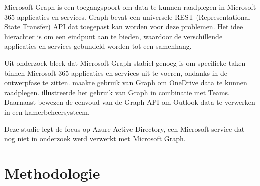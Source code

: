 Microsoft Graph is een toegangspoort om data te kunnen raadplegen in Microsoft 365 applicaties en services. Graph bevat een universele REST (Representational State Transfer) API dat toegepast kan worden voor deze problemen. Het idee hierachter is om een eindpunt aan te bieden, waardoor de verschillende applicaties en services gebundeld worden tot een samenhang. 

Uit onderzoek bleek dat Microsoft Graph stabiel genoeg is om specifieke taken binnen Microsoft 365 applicaties en services uit te voeren, ondanks in de ontwerpfase te zitten. \textcite{Hoefling2022} maakte gebruik van Graph om OneDrive data te kunnen raadplegen. \textcite{Jenkins2021} illustreerde het gebruik van Graph in combinatie met Teams. Daarnaast bewezen \textcite{Parsa2019} de eenvoud van de Graph API om Outlook data te verwerken in een kamerbeheersysteem. 

Deze studie legt de focus op Azure Active Directory, een Microsoft service dat nog niet in onderzoek werd verwerkt met Microsoft Graph. 

\section{Methodologie}%
\label{sec:methodologie}

